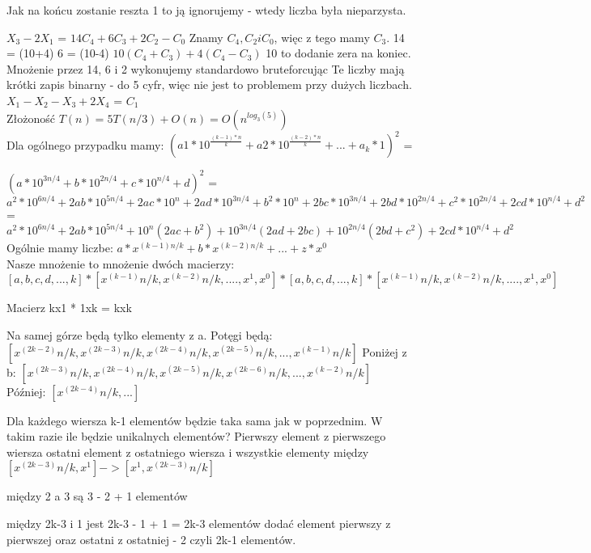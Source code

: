 \documentclass[12pt]{article}
\begin{document}
Jak na końcu zostanie reszta 1 to ją ignorujemy - wtedy liczba była nieparzysta.

$X_3 - 2X_1$ = $14C_4 + 6C_3 + 2C_2 - C_0$ 
Znamy $C_4, C_2 i C_0$, więc z tego mamy $C_3$.
14 = (10+4)
6 = (10-4)
$10(C_4 + C_3) + 4(C_4 - C_3)$
10 to dodanie zera na koniec.
Mnożenie przez 14, 6 i 2 wykonujemy standardowo bruteforcując Te liczby mają krótki zapis binarny - do 5 cyfr, więc nie jest to problemem przy dużych liczbach.\\

$X_1 - X_2 - X_3 + 2X_4$ = $C_1$\\

Złożoność $T(n) = 5T(n/3) + O(n) = O(n^{log_3(5)})$\\


Dla ogólnego przypadku mamy:
$(a1*10^\frac{(k-1)*n}{k}+a2*10^\frac{(k-2)*n}{k}+...+a_k*1)^2$ = 


$(a*10^{3n/4}+b*10^{2n/4}+c*10^{n/4}+d)^2$ = $a^2*10^{6n/4}+2ab*10^{5n/4}+2ac*10^n+2ad*10^{3n/4}+b^2*10^{n}+2bc*10^{3n/4}+2bd*10^{2n/4}+c^2*10^{2n/4}+2cd*10^{n/4}+d^2$ = $a^2*10^{6n/4}+2ab*10^{5n/4}+10^n (2ac + b^2) + 10^{3n/4} (2ad + 2bc) + 10^{2n/4} (2bd + c^2) + 2cd * 10^{n/4} + d^2$\\





Ogólnie mamy liczbe:
$a * x^{(k-1)n/k} + b * x^{(k-2)n/k} + ... + z * x^0$\\

Nasze mnożenie to mnożenie dwóch macierzy:
$[a, b, c, d, ..., k] * [x^(k-1)n/k, x^(k-2)n/k, ...., x^1, x^0] * [a, b, c, d, ..., k] * [x^(k-1)n/k, x^(k-2)n/k, ...., x^1, x^0] $

Macierz kx1 * 1xk = kxk  

Na samej górze będą tylko elementy z a.
Potęgi będą:
$[x^(2k-2)n/k, x^(2k-3)n/k, x^(2k-4)n/k, x^(2k-5)n/k, ..., x^(k-1)n/k]$
Poniżej z b:
$[x^(2k-3)n/k, x^(2k-4)n/k, x^(2k-5)n/k, x^(2k-6)n/k, ..., x^(k-2)n/k]$
Później:
$[x^(2k-4)n/k, ...]$

Dla każdego wiersza k-1 elementów będzie taka sama jak w poprzednim. 
W takim razie ile będzie unikalnych elementów?
Pierwszy element z pierwszego wiersza 
ostatni element z ostatniego wiersza 
i wszystkie elementy między $[x^(2k-3)n/k, x^1] -> [x^1, x^(2k-3)n/k]$ 

między 2 a 3 są 3 - 2 + 1 elementów 

między 2k-3 i 1 jest 2k-3 - 1 + 1 = 2k-3 elementów 
dodać element pierwszy z pierwszej oraz ostatni z ostatniej - 2 
czyli 2k-1 elementów.
\end{document}
